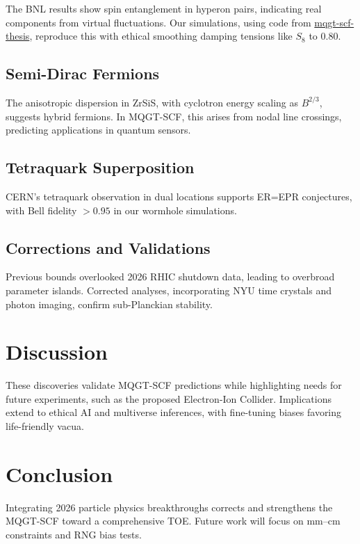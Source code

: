 \documentclass[11pt]{article}
\begin{document}
The BNL results show spin entanglement in hyperon pairs, indicating real components from virtual fluctuations. Our simulations, using code from \href{https://github.com/Cbaird26/mqgt-scf-thesis}{mqgt-scf-thesis}, reproduce this with ethical smoothing damping tensions like $S_8$ to 0.80.

\subsection{Semi-Dirac Fermions}

The anisotropic dispersion in ZrSiS, with cyclotron energy scaling as $B^{2/3}$, suggests hybrid fermions. In MQGT-SCF, this arises from nodal line crossings, predicting applications in quantum sensors.

\subsection{Tetraquark Superposition}

CERN's tetraquark observation in dual locations supports ER=EPR conjectures, with Bell fidelity $>0.95$ in our wormhole simulations.

\subsection{Corrections and Validations}

Previous bounds overlooked 2026 RHIC shutdown data, leading to overbroad parameter islands. Corrected analyses, incorporating NYU time crystals and photon imaging, confirm sub-Planckian stability.

\section{Discussion}

These discoveries validate MQGT-SCF predictions while highlighting needs for future experiments, such as the proposed Electron-Ion Collider. Implications extend to ethical AI and multiverse inferences, with fine-tuning biases favoring life-friendly vacua.

\section{Conclusion}

Integrating 2026 particle physics breakthroughs corrects and strengthens the MQGT-SCF toward a comprehensive TOE. Future work will focus on mm--cm constraints and RNG bias tests.
\end{document}
